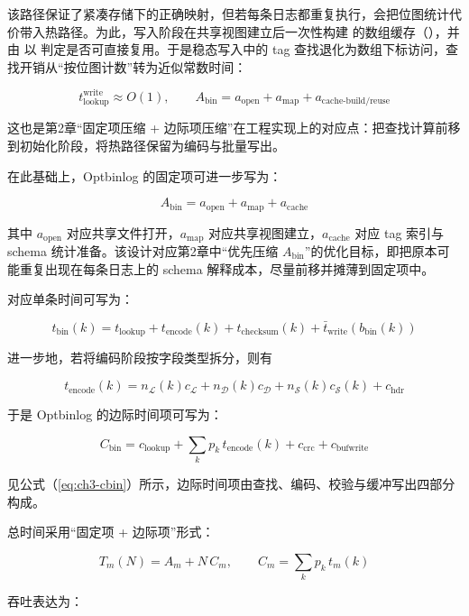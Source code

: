 该路径保证了紧凑存储下的正确映射，但若每条日志都重复执行，会把位图统计代价带入热路径。为此，写入阶段在共享视图建立后一次性构建  的数组缓存（），并由  以  判定是否可直接复用。于是稳态写入中的 tag 查找退化为数组下标访问，查找开销从``按位图计数''转为近似常数时间：

\[
t_{\text{lookup}}^{\text{write}}\approx O(1),\qquad
A_{\text{bin}}=a_{\text{open}}+a_{\text{map}}+a_{\text{cache-build/reuse}}
\]

这也是第2章``固定项压缩 + 边际项压缩''在工程实现上的对应点：把查找计算前移到初始化阶段，将热路径保留为编码与批量写出。

在此基础上，Optbinlog 的固定项可进一步写为：

\[
A_{\text{bin}}=a_{\text{open}}+a_{\text{map}}+a_{\text{cache}}
\]

其中 \(a_{\text{open}}\) 对应共享文件打开，\(a_{\text{map}}\) 对应共享视图建立，\(a_{\text{cache}}\) 对应 tag 索引与 schema 统计准备。该设计对应第2章中``优先压缩 \(A_{\text{bin}}\)''的优化目标，即把原本可能重复出现在每条日志上的 schema 解释成本，尽量前移并摊薄到固定项中。

对应单条时间可写为：

\begin{equation}
t_{\text{bin}}(k)=t_{\text{lookup}}+t_{\text{encode}}(k)+t_{\text{checksum}}(k)+\bar t_{\text{write}}(b_{\text{bin}}(k))
\label{eq:ch3-tbin-k}
\end{equation}

进一步地，若将编码阶段按字段类型拆分，则有

\[
t_{\text{encode}}(k)=n_{\mathcal{L}}(k)c_{\mathcal{L}}+n_{\mathcal{D}}(k)c_{\mathcal{D}}+n_{\mathcal{S}}(k)c_{\mathcal{S}}(k)+c_{\text{hdr}}
\]

于是 Optbinlog 的边际时间项可写为：

\begin{equation}
C_{\text{bin}}=c_{\text{lookup}}+\sum_k p_k\,t_{\text{encode}}(k)+c_{\text{crc}}+c_{\text{bufwrite}}
\label{eq:ch3-cbin}
\end{equation}

见公式（\ref{eq:ch3-cbin}）所示，边际时间项由查找、编码、校验与缓冲写出四部分构成。

总时间采用``固定项 + 边际项''形式：

\[
T_m(N)=A_m+N\,C_m,\qquad C_m=\sum_k p_k\,t_m(k)
\]

吞吐表达为：

